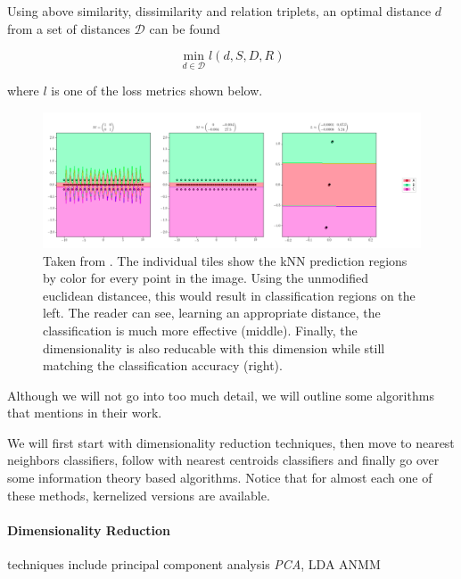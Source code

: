 \documentclass[a4paper,12pt,twoside,openright]{report}
\begin{document}
Using above similarity, dissimilarity and relation triplets, an optimal distance $d$ from a set of distances $\mathcal{D}$ can be found

\begin{equation}
\min_{d \in \mathcal{D}} l (d, S, D, R)
\end{equation}

where $l$ is one of the loss metrics shown below.



\begin{figure}[H]
	\center
  \includegraphics[width=\linewidth]{./assets/relatedwork/metric_learning_example.png}
  \caption{Taken from \cite{suarez19}. The individual tiles show the kNN prediction regions by color for every point in the image. Using the unmodified euclidean distancee, this would result in classification regions on the left. The reader can see, learning an appropriate distance, the classification is much more effective (middle). Finally, the dimensionality is also reducable with this dimension while still matching the classification accuracy (right).}
  \label{fig:BERT_vanilla_pipeline}
\end{figure}

Although we will not go into too much detail, we will outline some algorithms that \cite{suarez19} mentions in their work.

We will first start with dimensionality reduction techniques, then move to nearest neighbors classifiers, follow with nearest centroids classifiers and finally go over some information theory based algorithms.
Notice that for almost each one of these methods, kernelized versions are available.




\paragraph{Dimensionality Reduction} techniques include principal component analysis \textit{PCA}, LDA ANMM
\end{document}
